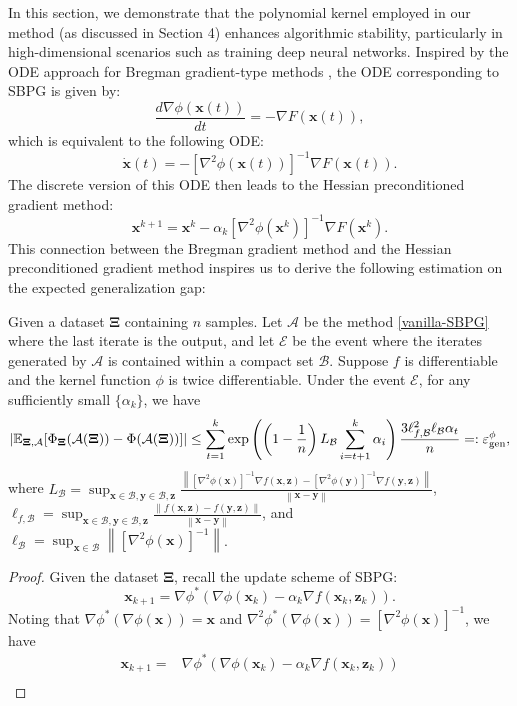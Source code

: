 \documentclass[twoside,11pt]{article}
\newcommand{\E}{\mathbb{E}}
\newcommand{\cA}{\mathcal A}
\newcommand{\cB}{\mathcal B}
\newcommand{\cE}{\mathcal E}
\def\norm#1{\left\|#1\right\|}
\def\vx{{\bm{x}}}
\def\vy{{\bm{y}}}
\def\vz{{\bm{z}}}
\begin{document}
{In this section, we demonstrate that the polynomial kernel employed in our method (as discussed in Section 4) enhances algorithmic stability, particularly in high-dimensional scenarios such as training deep neural networks. Inspired by the ODE approach for Bregman gradient-type methods \citep{alvarez2004hessian, ding2024stochastic}, the ODE corresponding to SBPG is given by:
\[
\frac{d\nabla\phi(\vx(t))}{d t}=-\nabla F(\vx(t)), 
\]
which is equivalent to the following ODE:
\[
\dot\vx(t)=-[\nabla^2\phi(\vx(t))]^{-1}\nabla F(\vx(t)).
\]
The discrete version of this ODE then leads to the Hessian preconditioned gradient method:
\[
\vx^{k+1}=\vx^k-\alpha_k [\nabla^2\phi(\vx^k)]^{-1}\nabla F(\vx^k).
\]
This connection between the Bregman gradient method and the Hessian preconditioned gradient method inspires us to derive the following estimation on the expected generalization gap:
\begin{theorem}
Given a dataset $\bm\Xi$ containing $n$ samples. Let $\cA$ be the method \eqref{vanilla-SBPG} where the last iterate is the output, and let $\cE$ be the event where the iterates generated by $\cA$ is contained within a compact set $\cB$. Suppose $f$ is differentiable and the kernel function $\phi$ is twice differentiable. Under the event $\cE$, for any sufficiently small $\{\alpha_k\}$, we have
\begin{equation}
|\E_{\bm\Xi,\cA}[\Phi_{\bm\Xi}(\cA(\bm\Xi))-\Phi(\cA(\bm\Xi))]|\leq\sum_{t=1}^k\exp\left(\left(1-\frac{1}{n}\right)L_{\cB}\sum_{i=t+1}^k\alpha_i\right)\frac{3\ell_{f,\cB}^2\ell_{\cB}\alpha_t}{n}=:\varepsilon_{\rm gen}^{\phi},
\label{eq:stability-bound}
\end{equation}
where $L_{\cB}=\sup_{\vx\in\cB,\vy\in\cB,\vz}\frac{\norm{[\nabla^2\phi(\vx)]^{-1}\nabla f(\vx,\vz)-[\nabla^2\phi(\vy)]^{-1}\nabla f(\vy,\vz)}}{\norm{\vx-\vy}}$, $\ell_{f,\cB}=\sup_{\vx\in\cB,\vy\in\cB,\vz}\frac{\norm{f(\vx,\vz)-f(\vy,\vz)}}{\norm{\vx-\vy}}$, and $\ell_{\cB}=\sup_{\vx\in\cB}\norm{[\nabla^2\phi(\vx)]^{-1}}$.
\label{thm:alg-stability}
\end{theorem}
\begin{proof}
Given the dataset $\bm\Xi$, recall the update scheme of SBPG:
\[
\vx_{k+1}=\nabla\phi^*(\nabla \phi(\vx_k)-\alpha_k\nabla f(\vx_k,\vz_k)).
\]
Noting that $\nabla\phi^*(\nabla\phi(\vx))=\vx$ and $\nabla^2\phi^*(\nabla\phi(\vx))=[\nabla^2\phi(\vx)]^{-1}$, we have
\[
\begin{aligned}
\vx_{k+1}=&\nabla\phi^*(\nabla \phi(\vx_k)-\alpha_k\nabla f(\vx_k,\vz_k))\\

\end{aligned}\]
\end{proof}}
\end{document}
